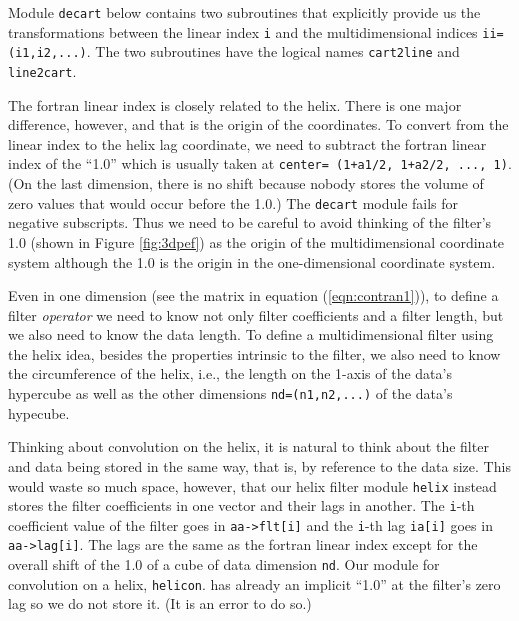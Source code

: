 \par
Module \texttt{decart} below contains
two subroutines that
explicitly provide us the transformations
between the linear index
\texttt{i}
and the multidimensional indices
\texttt{ii= (i1,i2,...)}.
The two subroutines have the logical names
\texttt{cart2line} and
\texttt{line2cart}.

\par
The fortran linear index is closely related to the helix.
There is one major difference, however,
and that is the origin of the coordinates.
To convert from the linear index
to the helix lag coordinate,
we need to subtract the fortran linear index of the ``1.0''
which is usually taken at
\texttt{center= (1+a1/2, 1+a2/2, ..., 1)}.
(On the last dimension, there is no shift because nobody stores the
volume of zero values that would occur before the 1.0.)
The \texttt{decart} module fails for negative subscripts.
Thus we need to be careful to avoid thinking of the filter's 1.0 
(shown in Figure \ref{fig:3dpef})
as the origin of the multidimensional coordinate system
although the 1.0 is the origin in the one-dimensional coordinate system.

\par
Even in one dimension
(see the matrix in equation (\ref{eqn:contran1})),
to define a filter {\it operator} we need to know
not only filter coefficients and a filter length,
but we also need to know the data length.
To define a multidimensional filter using the helix idea,
besides the properties intrinsic to the filter,
we also need to know the circumference of the helix,
i.e., the length on the 1-axis of the data's hypercube
as well as the other dimensions
\texttt{nd=(n1,n2,...)}
of the data's hypecube.

\par
Thinking about convolution on the helix,
it is natural to think about the filter and data being stored
in the same way, that is, by reference to the data size.
This would waste so much space, however,
that our helix filter module
\texttt{helix} 
instead stores the filter coefficients in one vector
and their lags in another.
The \texttt{i}-th coefficient value
of the filter goes in  \verb#aa->flt[i]# and
the \texttt{i}-th lag \texttt{ia[i]} goes in \verb#aa->lag[i]#.
The lags are the same as the fortran linear index
except for the overall shift of the 1.0 of a cube of 
data dimension \texttt{nd}.
Our module for convolution on a helix,
\texttt{helicon}. %
has already an implicit
``1.0'' at the filter's zero lag so we do not store it.
(It is an error to do so.)

